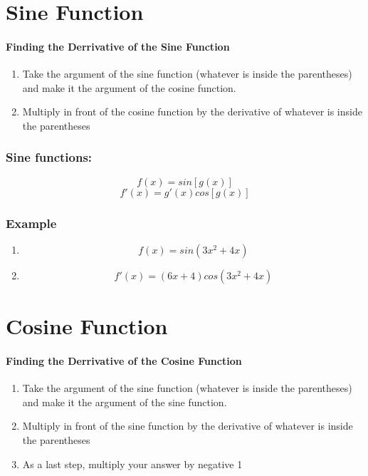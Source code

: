 \documentclass[a4paper,11pt]{book}
\begin{document}
\section{Sine Function}
\paragraph{Finding the Derrivative of the Sine Function}
\normalsize 
\begin{enumerate}
  \item Take the argument of the sine function (whatever is inside the parentheses) and make it the argument of the cosine function.
  \item Multiply in front of the cosine function by the derivative of whatever is inside the parentheses
\end{enumerate}

\subsubsection{Sine functions:}
\LARGE 
\[ f(x) = sin[g(x)] \]
\[ f'(x) = g'(x)cos[g(x)] \]

\subsubsection{Example}
\LARGE 
\begin{enumerate}
  \item \[ f(x) = sin(3x^2 + 4x) \]
  \item \[ f'(x) = (6x + 4)cos(3x^2 + 4x) \]
\end{enumerate}
\normalsize 









\section{Cosine Function}
\paragraph{Finding the Derrivative of the Cosine Function}
\normalsize 
\begin{enumerate}
  \item Take the argument of the sine function (whatever is inside the parentheses) and make it the argument of the sine function.
  \item Multiply in front of the sine function by the derivative of whatever is inside the parentheses
  \item As a last step, multiply your answer by negative 1
\end{enumerate}
\end{document}

